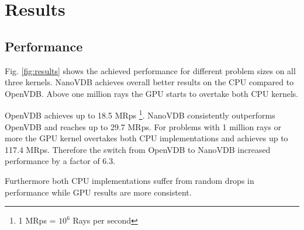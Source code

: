 \section{Results}
\subsection{Performance}

Fig. \ref{fig:results} shows the achieved performance for different problem sizes on all three kernels.
NanoVDB achieves overall better results on the CPU compared to OpenVDB. 
Above one million rays the GPU starts to overtake both CPU kernels.

OpenVDB achieves up to 18.5 MRps \footnote{1 MRps = $10^6$ Rays per second}. NanoVDB consistently outperforms OpenVDB and reaches up to 29.7 MRps.
For problems with 1 million rays or more the GPU kernel overtakes both CPU implementations and achieves up to 117.4 MRps.
Therefore the switch from OpenVDB to NanoVDB increased performance by a factor of 6.3.
 
Furthermore both CPU implementations suffer from random drops in performance while GPU results are more consistent. 


